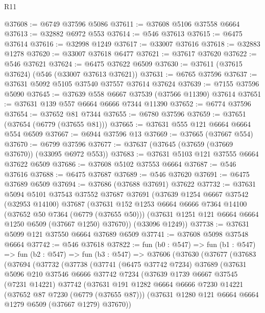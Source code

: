 \begin{lexlean}{R11}
\begin{coremodule}
@37608 := @6749 @37596 @5086
@37611 := @37608 @5106 @37558 @6664
@37613 := @32882 @6972 @553
@37614 := @546 @37613
@37615 := @6475 @37614
@37616 := @32998 @1249
@37617 := @33007 @37616
@37618 := @32883 @1278
@37620 := @33007 @37618 @6477
@37621 := @37617 @37620
@37622 := @546 @37621
@37624 := @6475 @37622 @6509
@37630 := @37611 (@37615 @37624) (@546 (@33007 @37613 @37621))
@37631 := @6765 @37596
@37637 := @37631 @5092 @5105 @37540 @37557 @37614 @37624
@37639 := @7155 @37596 @5090
@37645 := @37639 @558 @6667 @37539 (@37566 @11390) @37614
@37651 := @37631 @139 @557 @6664 @6666 @7344 @11390
@37652 := @6774 @37596
@37654 := @37652 @81 @7344
@37655 := @6780 @37596
@37659 := @37651 (@37654 (@6779 (@37655 @81)))
@37665 := @37631 @555 @121 @6664 @6664 @554 @6509
@37667 := @6944 @37596 @13
@37669 := @37665 (@37667 @554)
@37670 := @6799 @37596
@37677 := @37637 (@37645 (@37659 (@37669 @37670)) (@33095 @6972 @553))
@37683 := @37631 @5103 @121 @37555 @6664 @37622 @6509
@37686 := @37608 @5102 @37553 @6664
@37687 := @546 @37616
@37688 := @6475 @37687
@37689 := @546 @37620
@37691 := @6475 @37689 @6509
@37694 := @37686 (@37688 @37691) @37622
@37732 := @37631
    @5094
    @5101
    @37543
    @37552
    @37687
    @37691
    (@37639
      @1254
      @6667
      @37542
      (@32953 @14100)
      @37687
      (@37631
        @152
        @1253
        @6664
        @6666
        @7364
        @14100
        (@37652 @50 @7364 (@6779 (@37655 @50)))
        (@37631 @1251 @121 @6664 @6664 @1250 @6509 (@37667 @1250) @37670))
      (@33096 @1249))
@37738 := @37631 @5099 @121 @37550 @6664 @37689 @6509
@37741 := @37608 @5098 @37548 @6664
@37742 := @546 @37618
@37822 := fun (b0 : @547) =>
  fun (b1 : @547) =>
  fun (b2 : @547) =>
  fun (b3 : @547) =>
  @37606
    (@37630
      (@37677
        (@37683
          (@37694
            (@37732
              (@37738
                (@37741
                  (@6475 @37742 @7234)
                  @37689
                  (@37631
                    @5096
                    @210
                    @37546
                    @6666
                    @37742
                    @7234
                    (@37639
                      @1739
                      @6667
                      @37545
                      (@7231 @14221)
                      @37742
                      (@37631
                        @191
                        @1282
                        @6664
                        @6666
                        @7230
                        @14221
                        (@37652 @87 @7230 (@6779 (@37655 @87)))
                        (@37631 @1280 @121 @6664 @6664 @1279 @6509 (@37667 @1279) @37670))

\end{coremodule}
\end{lexlean}
